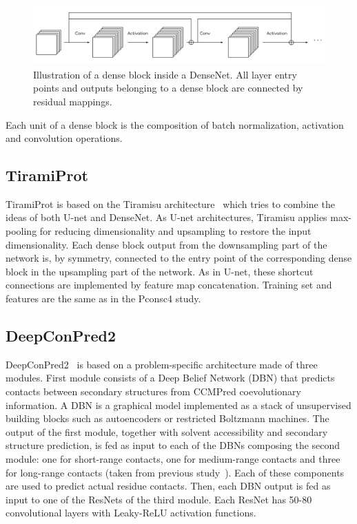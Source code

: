         \begin{figure}[H]
            \begin{center}
                \includegraphics[width=\textwidth, keepaspectratio]{imgs/densenet.png}
                \caption{Illustration of a dense block inside a DenseNet.
                All layer entry points and outputs belonging to a dense block are connected
                by residual mappings.}
                \label{densenet}
            \end{center}
        \end{figure}

        Each unit of a dense block is the composition of batch normalization, activation and
        convolution operations.

    \subsection{TiramiProt}

        TiramiProt is based on the Tiramisu architecture~\cite{TsardakasRenhuldt1228846}
        which tries to combine the ideas of both U-net and DenseNet.
        As U-net architectures, Tiramisu applies max-pooling for reducing dimensionality
        and upsampling to restore the input dimensionality. Each dense block output from
        the downsampling part of the network is, by symmetry, connected to the entry point
        of the corresponding dense block in the upsampling part of the network.
        As in U-net, these shortcut connections are implemented by feature map concatenation.
        Training set and features are the same as in the Pconsc4 study.

    \subsection{DeepConPred2}

        DeepConPred2~\cite{DeepConPred2} is based on a problem-specific architecture made
        of three modules. First module consists of a Deep Belief Network (DBN) that predicts 
        contacts between secondary structures from CCMPred coevolutionary information.
        A DBN is a graphical model implemented as
        a stack of unsupervised building blocks such as autoencoders or
        restricted Boltzmann machines.
        The output of the first module, together with solvent accessibility and secondary
        structure prediction, is fed as input to each of the DBNs composing
        the second module: one for short-range contacts, one for medium-range contacts
        and three for long-range contacts (taken from previous study~\cite{xiong2017deep}).
        Each of these components are used to predict actual residue contacts.
        Then, each DBN output is fed as input to one of the ResNets of the third module.
        Each ResNet has 50-80 convolutional layers with Leaky-ReLU activation functions.

